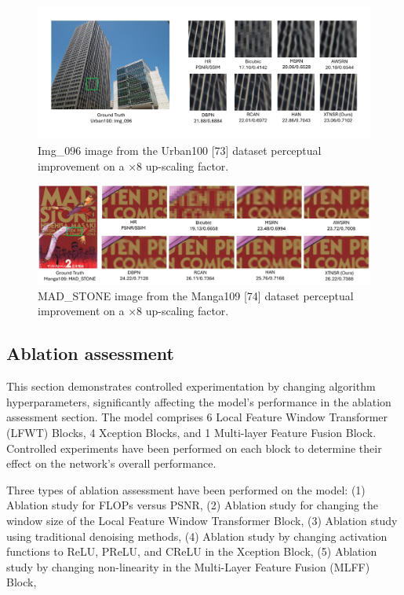 \documentclass[twocolumn]{svjour3}          %
\begin{document}
\begin{figure}
  \centering
  \includegraphics[width=\linewidth]{15FIGURE.pdf}
   \caption {Img\_096 image from the Urban100 [73] dataset perceptual improvement on a ×8 up-scaling factor.}
    \label{fig:18}
\end{figure}

\begin{figure}
  \centering
  \includegraphics[width=\linewidth]{16FIGURE.pdf}
   \caption {MAD\_STONE image from the Manga109 [74] dataset perceptual improvement on a ×8 up-scaling factor.}
    \label{fig:19}
\end{figure}

\subsection{Ablation assessment}

This section demonstrates controlled experimentation by changing algorithm hyperparameters, significantly affecting the model's performance in the ablation assessment section. The model comprises 6 Local Feature Window Transformer (LFWT) Blocks, 4 Xception Blocks, and 1 Multi-layer Feature Fusion Block. Controlled experiments have been performed on each block to determine their effect on the network's overall performance.

Three types of ablation assessment have been performed on the model: (1) Ablation study for FLOPs versus PSNR, (2) Ablation study for changing the window size of the Local Feature Window Transformer Block, (3) Ablation study using traditional denoising methods, (4) Ablation study by changing activation functions to ReLU, PReLU, and CReLU in the Xception Block, (5) Ablation study by changing non-linearity in the Multi-Layer Feature Fusion (MLFF) Block,
\end{document}
